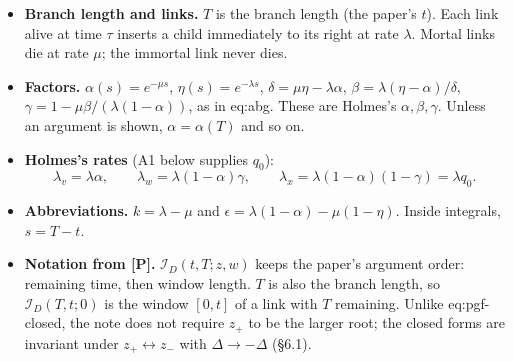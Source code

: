 \documentclass[10pt,]{article}
\providecommand{\tightlist}{%
  \setlength{\itemsep}{0pt}\setlength{\parskip}{0pt}}
\begin{document}
\begin{itemize}
\tightlist
\item
  \textbf{Branch length and links.} \(T\) is the branch length (the
  paper's \(t\)). Each link alive at time \(\tau\) inserts a child
  immediately to its right at rate \(\lambda\). Mortal links die at rate
  \(\mu\); the immortal link never dies.
\item
  \textbf{Factors.} \(\alpha(s)=e^{-\mu s}\),
  \(\eta(s)=e^{-\lambda s}\), \(\delta=\mu\eta-\lambda\alpha\),
  \(\beta=\lambda(\eta-\alpha)/\delta\),
  \(\gamma=1-\mu\beta/(\lambda(1-\alpha))\), as in eq:abg. These are
  Holmes's \(\alpha,\beta,\gamma\). Unless an argument is shown,
  \(\alpha=\alpha(T)\) and so on.
\item
  \textbf{Holmes's rates} (A1 below supplies \(q_0\)):
  \[\lambda_v=\lambda\alpha,\qquad\lambda_w=\lambda(1-\alpha)\gamma,\qquad\lambda_x=\lambda(1-\alpha)(1-\gamma)=\lambda q_0 .\]
\item
  \textbf{Abbreviations.} \(k=\lambda-\mu\) and
  \(\epsilon=\lambda(1-\alpha)-\mu(1-\eta)\). Inside integrals,
  \(s=T-t\).
\item
  \textbf{Notation from {[}P{]}.} \(\mathcal I_D(t,T;z,w)\) keeps the
  paper's argument order: remaining time, then window length. \(T\) is
  also the branch length, so \(\mathcal I_D(T,t;0)\) is the window
  \([0,t]\) of a link with \(T\) remaining. Unlike eq:pgf-closed, the
  note does not require \(z_+\) to be the larger root; the closed forms
  are invariant under \(z_+\leftrightarrow z_-\) with
  \(\Delta\to-\Delta\) (§6.1).
\end{itemize}
\end{document}

